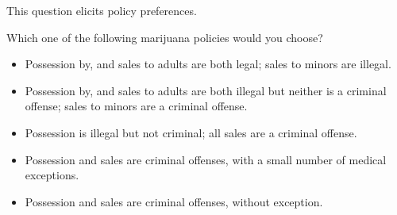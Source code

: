 
This question elicits policy preferences.

\begin{tcolorbox}
Which one of the following marijuana policies would you choose?

\begin{itemize}
	\setlength\itemsep{-5pt}
	\item Possession by, and sales to adults are both legal; sales to minors are illegal.
	\item Possession by, and sales to adults are both illegal but neither is a criminal offense; sales to minors are a criminal offense.
	\item Possession is illegal but not criminal; all sales are a criminal offense.
	\item Possession and sales are criminal offenses, with a small number of medical exceptions.
	\item Possession and sales are criminal offenses, without exception.
\end{itemize}
\end{tcolorbox}
